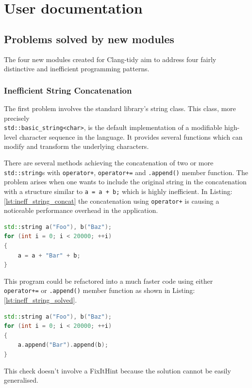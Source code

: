 \section{User documentation}
\subsection{Problems solved by new modules}
\par The four new modules created for Clang-tidy aim to address four fairly distinctive and inefficient programming patterns.
\subsubsection{Inefficient String Concatenation\cite{clang_tidy_string_concat}}
\par The first problem involves the standard library's string class. This class, more precisely \\\verb|std::basic_string<char>|, is the default implementation of a modifiable high-level character sequence in the language. It provides several functions which can modify and transform the underlying characters. \medskip
\par There are several methods achieving the concatenation of two or more \\ \verb|std::string|s with \verb|operator+|, \verb|operator+=| and \verb|.append()| member function. The problem arises when one wants to include the original string in the concatenation with a structure similar to \verb|a = a + b;| which is highly inefficient. In Listing:\ref{lst:ineff_string_concat} the concatenation using \verb|operator+| is causing a noticeable performance overhead in the application.  \\
\begin{lstlisting}[language=c++, frame=single ,caption={Highly inefficient code}, label={lst:ineff_string_concat}]
std::string a("Foo"), b("Baz");
for (int i = 0; i < 20000; ++i)
{
	a = a + "Bar" + b;
}
\end{lstlisting}
\par This program could be refactored into a much faster code using either \verb|operator+=| or \verb|.append()| member function as shown in Listing:\ref{lst:ineff_string_solved}.
 \begin{lstlisting}[language=c++, frame=single ,caption={A more efficient version}, label={lst:ineff_string_solved}]
std::string a("Foo"), b("Baz");
for (int i = 0; i < 20000; ++i)
{
	a.append("Bar").append(b);
}
\end{lstlisting}
\par This check doesn't involve a FixItHint because the solution cannot be easily generalised.
